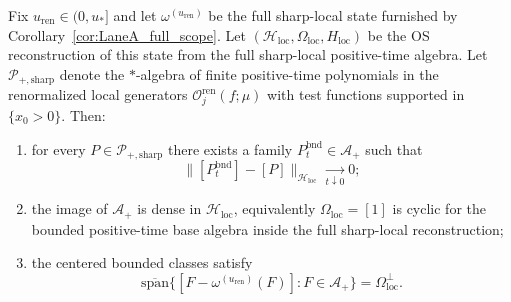 \begin{theorem}\label{thm:LaneA_bounded_base_cyclic}
Fix $u_{\mathrm{ren}}\in(0,u_\ast]$ and let $\omega^{(u_{\mathrm{ren}})}$ be the full sharp-local state furnished by Corollary~\ref{cor:LaneA_full_scope}.
Let $(\mathcal H_{\mathrm{loc}},\Omega_{\mathrm{loc}},H_{\mathrm{loc}})$ be the OS reconstruction of this state from the full sharp-local positive-time algebra.
Let $\mathcal P_{+,\mathrm{sharp}}$ denote the $\ast$-algebra of finite positive-time polynomials in the renormalized local generators
$\mathcal O^{\mathrm{ren}}_j(f;\mu)$ with test functions supported in $\{x_0>0\}$.
Then:
\begin{enumerate}[label=(\roman*),leftmargin=2.3em]
\item for every $P\in\mathcal P_{+,\mathrm{sharp}}$ there exists a family $P_t^{\mathrm{bnd}}\in\mathcal A_+$ such that
\[
\|[P_t^{\mathrm{bnd}}]-[P]\|_{\mathcal H_{\mathrm{loc}}}\xrightarrow[t\downarrow 0]{}0;
\]
\item the image of $\mathcal A_+$ is dense in $\mathcal H_{\mathrm{loc}}$, equivalently $\Omega_{\mathrm{loc}}=[1]$ is cyclic for the bounded positive-time base algebra inside the full sharp-local reconstruction;
\item the centered bounded classes satisfy
\[
\overline{\mathrm{span}}\{[F-\omega^{(u_{\mathrm{ren}})}(F)]:F\in\mathcal A_+\}=\Omega_{\mathrm{loc}}^\perp.
\]
\end{enumerate}
\end{theorem}

